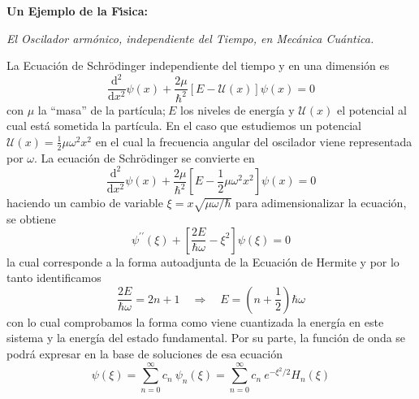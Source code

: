 \documentclass[spanish,notitlepage,letterpaper,12pt]{article}
\begin{document}
\begin{center}
\textbf{Un Ejemplo de la F\'{\i}sica:}

\textit{El Oscilador arm\'{o}nico, independiente del Tiempo, en Mec\'{a}nica
Cu\'{a}ntica.}
\end{center}

La Ecuaci\'{o}n de Schr\"{o}dinger independiente del tiempo y en una
dimensi\'{o}n es
\[
\frac{\mathrm{d}^{2}}{\mathrm{d}x^{2}}\psi(x)+\frac{2\mu}{\hbar^{2}}\left[
E-\mathcal{U}(x)\right]  \psi(x)=0
\]
con $\mu$ la ``masa'' de la part\'{i}cula;$\ E$ los niveles de energ\'{i}a y
$\mathcal{U}(x)$ el potencial al cual est\'{a} sometida la part\'{i}cula. En
el caso que estudiemos un potencial $\mathcal{U}(x)=\frac{1}{2}\mu\omega
^{2}x^{2}$ en el cual la frecuencia angular del oscilador viene representada
por $\omega$. La ecuaci\'{o}n de Schr\"{o}dinger se convierte en
\[
\frac{\mathrm{d}^{2}}{\mathrm{d}x^{2}}\psi(x)+\frac{2\mu}{\hbar^{2}}\left[
E-\frac{1}{2}\mu\omega^{2}x^{2}\right]  \psi(x)=0
\]
haciendo un cambio de variable $\xi=x\sqrt{\mu\omega/\hbar}$ para
adimensionalizar la ecuaci\'{o}n, se obtiene
\[
\psi^{\prime\prime}(\xi)+\left[  \frac{2E}{\hbar\omega}-\xi^{2}\right]
\psi(\xi)=0
\]
la cual corresponde a la forma autoadjunta de la Ecuaci\'{o}n de Hermite y por
lo tanto identificamos
\[
\frac{2E}{\hbar\omega}=2n+1\quad\Rightarrow\quad E=\left(  n+\frac{1}%
{2}\right)  \hbar\omega
\]
con lo cual comprobamos la forma como viene cuantizada la energ\'{i}a en este
sistema y la energ\'{i}a del estado fundamental. Por su parte, la funci\'{o}n
de onda se podr\'{a} expresar en la base de soluciones de esa ecuaci\'{o}n
\[
\psi(\xi)=\sum_{n=0}^{\infty}c_{n}\ \psi_{n}(\xi)=\sum_{n=0}^{\infty}%
c_{n}\ e^{-\xi^{2}/2}H_{n}(\xi)
\]
\end{document}
